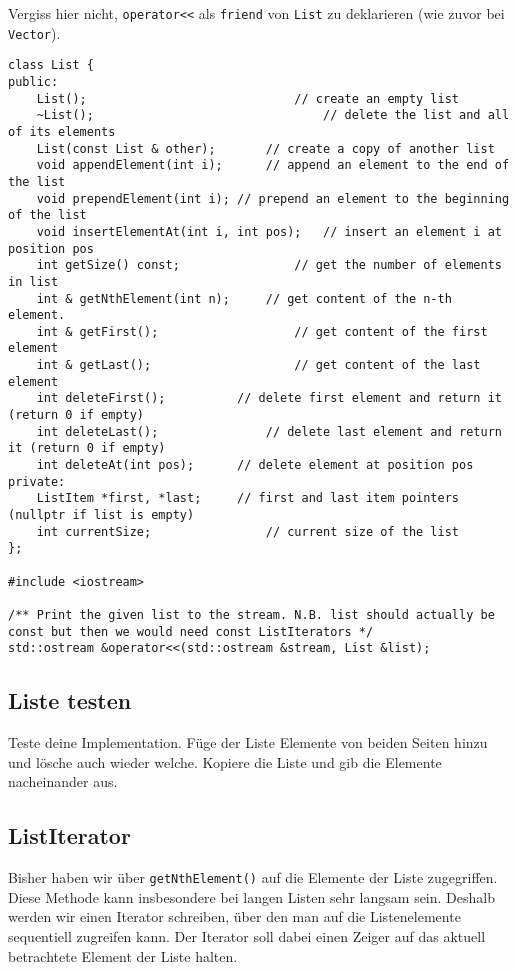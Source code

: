 Vergiss hier nicht, \texttt{operator<<} als \texttt{friend} von \texttt{List} zu deklarieren (wie zuvor bei \texttt{Vector}).

\begin{lstlisting}
class List {
public:
	List();								// create an empty list
	~List();								// delete the list and all of its elements
	List(const List & other);		// create a copy of another list
	void appendElement(int i);		// append an element to the end of the list
	void prependElement(int i);	// prepend an element to the beginning of the list
	void insertElementAt(int i, int pos);	// insert an element i at position pos
	int getSize() const;				// get the number of elements in list
	int & getNthElement(int n);		// get content of the n-th element.
	int & getFirst();					// get content of the first element
	int & getLast();					// get content of the last element
	int deleteFirst();			// delete first element and return it (return 0 if empty)
	int deleteLast();				// delete last element and return it (return 0 if empty)
	int deleteAt(int pos);		// delete element at position pos
private:
	ListItem *first, *last;		// first and last item pointers (nullptr if list is empty)
	int currentSize;				// current size of the list
};

#include <iostream>

/** Print the given list to the stream. N.B. list should actually be const but then we would need const ListIterators */
std::ostream &operator<<(std::ostream &stream, List &list);
\end{lstlisting}

\subsection{Liste testen}
Teste deine Implementation.
Füge der Liste Elemente von beiden Seiten hinzu und lösche auch wieder welche.
Kopiere die Liste und gib die Elemente nacheinander aus.

\subsection{ListIterator}
Bisher haben wir über \texttt{getNthElement()} auf die Elemente der Liste zugegriffen.
Diese Methode kann insbesondere bei langen Listen sehr langsam sein.
Deshalb werden wir einen Iterator schreiben, über den man auf die Listenelemente sequentiell zugreifen kann.
Der Iterator soll dabei einen Zeiger auf das aktuell betrachtete Element der Liste halten.

